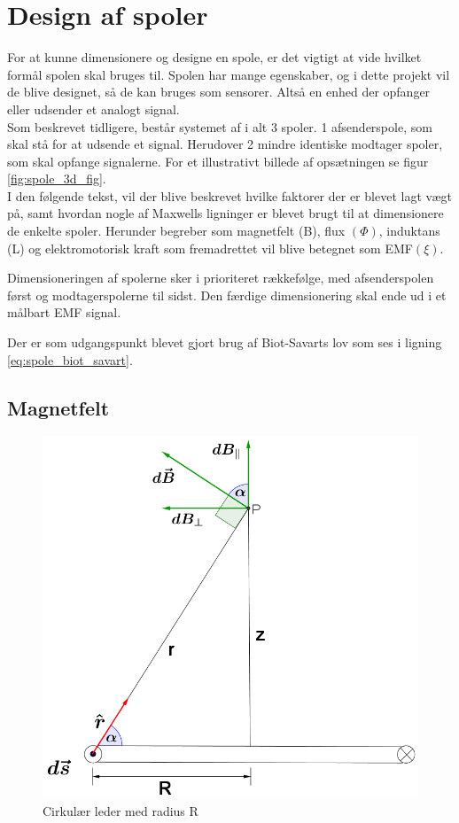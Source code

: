 \section{Design af spoler}\label{sec:sec_spole_design}
For at kunne dimensionere og designe en spole, er det vigtigt at vide hvilket formål spolen skal bruges til. Spolen har mange egenskaber, og i dette projekt vil de blive designet, så de kan bruges som sensorer. Altså en enhed der opfanger eller udsender et analogt signal. \\
Som beskrevet tidligere, består systemet af i alt 3 spoler. 1 afsenderspole, som skal stå for at udsende et signal. Herudover 2 mindre identiske modtager spoler, som skal opfange signalerne. For et illustrativt billede af opsætningen se figur \ref{fig:spole_3d_fig}.\\
I den følgende tekst, vil der blive beskrevet hvilke faktorer der er blevet lagt vægt på, samt hvordan nogle af Maxwells ligninger er blevet brugt til at dimensionere de enkelte spoler. Herunder begreber som magnetfelt (B), flux $(\Phi)$, induktans (L) og elektromotorisk kraft som fremadrettet vil blive betegnet som EMF$(\xi)$. 

Dimensioneringen af spolerne sker i prioriteret rækkefølge, med afsenderspolen først og modtagerspolerne til sidst.
Den færdige dimensionering skal ende ud i et målbart EMF signal.

Der er som udgangspunkt blevet gjort brug af Biot-Savarts lov som ses i ligning \ref{eq:spole_biot_savart}.
\subsection{Magnetfelt}
\begin{figure}[h!]
	\centering
	\includegraphics[width=.6\textwidth]{billeder/B_felt.png}
	\caption{Cirkulær leder med radius R}
	\label{fig:spole_fig1}
\end{figure}

